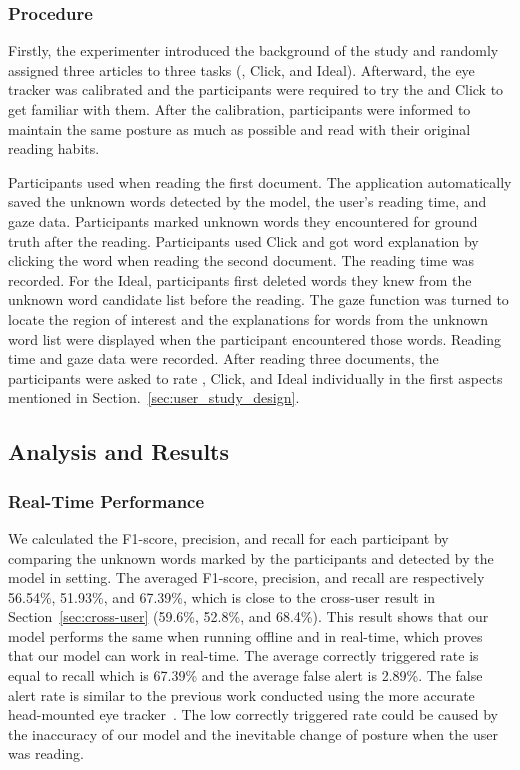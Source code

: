 \subsubsection{Procedure}
Firstly, the experimenter introduced the background of the study and randomly assigned three articles to three tasks (\name{}, Click, and Ideal). Afterward, the eye tracker was calibrated and the participants were required to try the \name{} and Click to get familiar with them. After the calibration, participants were informed to maintain the same posture as much as possible and read with their original reading habits. 

Participants used \name{} when reading the first document. The application automatically saved the unknown words detected by the model, the user's reading time, and gaze data. Participants marked unknown words they encountered for ground truth after the reading. Participants used Click and got word explanation by clicking the word when reading the second document. The reading time was recorded. For the Ideal, participants first deleted words they knew from the unknown word candidate list before the reading. The gaze function was turned to locate the region of interest and the explanations for words from the unknown word list were displayed when the participant encountered those words. Reading time and gaze data were recorded. After reading three documents, the participants were asked to rate \name{}, Click, and Ideal individually in the first aspects mentioned in Section.~\ref{sec:user_study_design}.

\subsection{Analysis and Results}
\label{sec:eval_result}
\subsubsection{Real-Time Performance}
\label{sec:eval_realtime_performance}
We calculated the F1-score, precision, and recall for each participant by comparing the unknown words marked by the participants and detected by the model in \name{} setting. The averaged F1-score, precision, and recall are respectively 56.54\%, 51.93\%, and 67.39\%, which is close to the cross-user result in Section~\ref{sec:cross-user} (59.6\%, 52.8\%, and 68.4\%). This result shows that our model performs the same when running offline and in real-time, which proves that our model can work in real-time. The average correctly triggered rate is equal to recall which is 67.39\% and the average false alert is 2.89\%. The false alert rate is similar to the previous work conducted using the more accurate head-mounted eye tracker~\cite{idict2006hyrskykari}. The low correctly triggered rate could be caused by the inaccuracy of our model and the inevitable change of posture when the user was reading.


